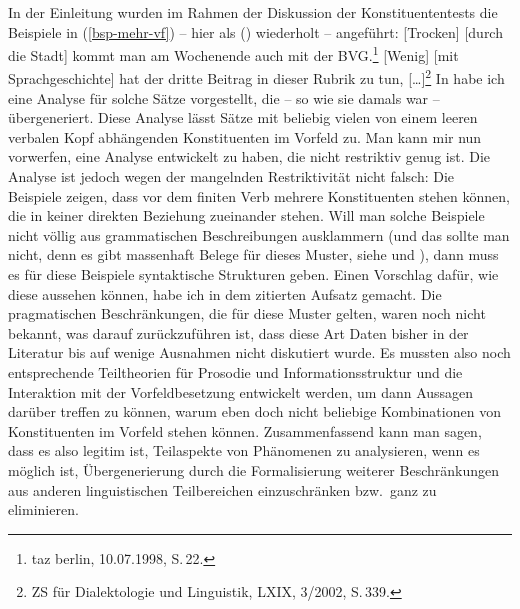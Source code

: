 In der Einleitung wurden im Rahmen der Diskussion der Konstituententests die Beispiele
in (\ref{bsp-mehr-vf}) -- hier als () wiederholt -- angeführt:
\eal
\ex {}[Trocken] [durch die Stadt] kommt man am Wochenende auch mit der BVG.\footnote{
        taz berlin, 10.07.1998, S.\,22.
      }
\ex {}[Wenig] [mit Sprachgeschichte] hat der dritte Beitrag in dieser Rubrik zu tun, [\ldots]\footnote{
  ZS für Dialektologie und Linguistik, LXIX, 3/2002, S.\,339.
}
\zl
In  habe ich eine Analyse für solche Sätze vorgestellt, die
-- so wie sie damals war -- übergeneriert. Diese Analyse lässt Sätze mit beliebig vielen von einem leeren verbalen Kopf abhängenden
Konstituenten im Vorfeld zu. Man kann mir nun vorwerfen, eine Analyse entwickelt zu haben,
die nicht restriktiv genug ist. Die Analyse ist jedoch wegen der mangelnden Restriktivität 
nicht falsch: Die Beispiele zeigen, dass vor dem finiten Verb mehrere Konstituenten stehen können,
die in keiner direkten Beziehung zueinander stehen. Will man solche Beispiele nicht völlig aus grammatischen
Beschreibungen ausklammern (und das sollte man nicht, denn es gibt massenhaft Belege für dieses Muster,
siehe \citealt{Mueller2003b} und \citealt{Bildhauer2011a}), dann muss es für diese Beispiele syntaktische Strukturen geben. Einen
Vorschlag dafür, wie diese aussehen können, habe ich in dem zitierten Aufsatz gemacht. Die pragmatischen
Beschränkungen, die für diese Muster gelten, waren noch nicht bekannt, was darauf zurückzuführen ist, dass
diese Art Daten bisher in der Literatur bis auf wenige Ausnahmen nicht diskutiert wurde. Es mussten
also noch entsprechende Teiltheorien für Prosodie und Informationsstruktur und die Interaktion mit
der Vorfeldbesetzung entwickelt werden, um dann Aussagen darüber treffen zu können, warum eben doch nicht
beliebige Kombinationen von Konstituenten im Vorfeld stehen können.
Zusammenfassend kann man sagen, dass es also legitim ist, Teilaspekte von Phänomenen zu analysieren,
wenn es möglich ist, Übergenerierung durch die Formalisierung weiterer Beschränkungen aus anderen
linguistischen Teilbereichen einzuschränken bzw.\ ganz zu eliminieren.

